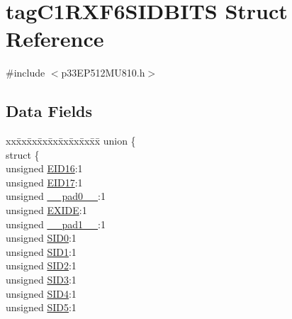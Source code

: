\hypertarget{structtag_c1_r_x_f6_s_i_d_b_i_t_s}{}\section{tag\+C1\+R\+X\+F6\+S\+I\+D\+B\+I\+TS Struct Reference}
\label{structtag_c1_r_x_f6_s_i_d_b_i_t_s}


{\ttfamily \#include $<$p33\+E\+P512\+M\+U810.\+h$>$}

\subsection*{Data Fields}
\begin{DoxyCompactItemize}
\item 
\begin{tabbing}
xx\=xx\=xx\=xx\=xx\=xx\=xx\=xx\=xx\=\kill
union \{\\
\>struct \{\\
\>\>unsigned \hyperlink{structtag_c1_r_x_f6_s_i_d_b_i_t_s_a6dd5663b0c9838c56db040560ca0efa1}{EID16}:1\\
\>\>unsigned \hyperlink{structtag_c1_r_x_f6_s_i_d_b_i_t_s_aa648615464b0eb29967529333eee9fd9}{EID17}:1\\
\>\>unsigned \hyperlink{structtag_c1_r_x_f6_s_i_d_b_i_t_s_adf71f3d8410c1f1dbbc96680a92c49af}{\_\_pad0\_\_}:1\\
\>\>unsigned \hyperlink{structtag_c1_r_x_f6_s_i_d_b_i_t_s_a09ff1c1be3927220bd3dfbc10edfe243}{EXIDE}:1\\
\>\>unsigned \hyperlink{structtag_c1_r_x_f6_s_i_d_b_i_t_s_acaf2d0924a107ec6e8d2e31febaf66f9}{\_\_pad1\_\_}:1\\
\>\>unsigned \hyperlink{structtag_c1_r_x_f6_s_i_d_b_i_t_s_a1ca276ac15df60e1f7b9a6d0011ade93}{SID0}:1\\
\>\>unsigned \hyperlink{structtag_c1_r_x_f6_s_i_d_b_i_t_s_a3405d354f81391f879648f69f504dfc8}{SID1}:1\\
\>\>unsigned \hyperlink{structtag_c1_r_x_f6_s_i_d_b_i_t_s_ad744966dfc49307f731b7045b01b94e5}{SID2}:1\\
\>\>unsigned \hyperlink{structtag_c1_r_x_f6_s_i_d_b_i_t_s_a9345f3e64720be93e83d8dfc827f3f45}{SID3}:1\\
\>\>unsigned \hyperlink{structtag_c1_r_x_f6_s_i_d_b_i_t_s_aefb106fed4bb40e2c3c71ac612c554e3}{SID4}:1\\
\>\>unsigned \hyperlink{structtag_c1_r_x_f6_s_i_d_b_i_t_s_a0f221b3c9612231686bf87ccdcec8489}{SID5}:1\\

\end{tabbing}
\end{DoxyCompactItemize}
